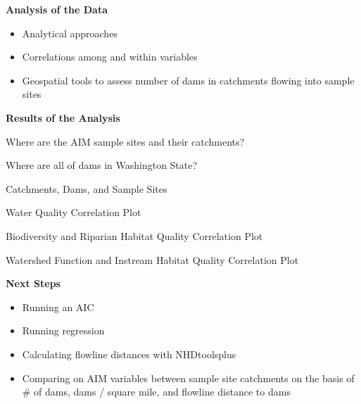 \documentclass[
  ignorenonframetext,
]{beamer}
\providecommand{\tightlist}{%
  \setlength{\itemsep}{0pt}\setlength{\parskip}{0pt}}
\begin{document}
\begin{frame}{\textbf{Analysis of the Data}}
\protect\hypertarget{analysis-of-the-data}{}
\begin{itemize}
\tightlist
\item
  Analytical approaches
\item
  Correlations among and within variables
\item
  Geospatial tools to assess number of dams in catchments flowing into
  sample sites
\end{itemize}
\end{frame}

\begin{frame}{\textbf{Results of the Analysis}}
\protect\hypertarget{results-of-the-analysis}{}
\end{frame}

\begin{frame}{Where are the AIM sample sites and their catchments?}
\protect\hypertarget{where-are-the-aim-sample-sites-and-their-catchments}{}
\end{frame}

\begin{frame}{Where are all of dams in Washington State?}
\protect\hypertarget{where-are-all-of-dams-in-washington-state}{}
\end{frame}

\begin{frame}{Catchments, Dams, and Sample Sites}
\protect\hypertarget{catchments-dams-and-sample-sites}{}
\end{frame}

\begin{frame}{Water Quality Correlation Plot}
\protect\hypertarget{water-quality-correlation-plot}{}
\end{frame}

\begin{frame}{Biodiversity and Riparian Habitat Quality Correlation
Plot}
\protect\hypertarget{biodiversity-and-riparian-habitat-quality-correlation-plot}{}
\end{frame}

\begin{frame}{Watershed Function and Instream Habitat Quality
Correlation Plot}
\protect\hypertarget{watershed-function-and-instream-habitat-quality-correlation-plot}{}
\end{frame}

\begin{frame}{\textbf{Next Steps}}
\protect\hypertarget{next-steps}{}
\begin{itemize}
\tightlist
\item
  Running an AIC
\item
  Running regression
\item
  Calculating flowline distances with NHDtoolsplus
\item
  Comparing on AIM variables between sample site catchments on the basis
  of \# of dams, dams / square mile, and flowline distance to dams
\end{itemize}
\end{frame}
\end{document}
